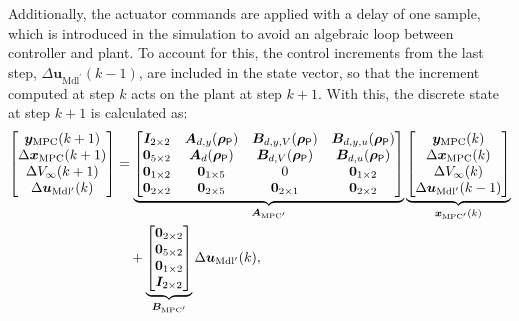 Additionally, the actuator commands are applied with a delay of one sample, which is introduced in the simulation to avoid an algebraic loop between controller and plant. To account for this, the control increments from the last step, $\Delta \bm{u}_{\text{Mdl}^\prime}(k-1)$, are included in the state vector, so that the increment computed at step $k$ acts on the plant at step $k+1$. 
With this, the discrete state at step $k+1$ is calculated as:
\begin{equation} \label{eq:FinalStateSpace}
    \begin{aligned}
        \begin{bmatrix}
            \bm{y}_{\text{MPC}}(k+1) \\
            \Delta \bm{x}_{\text{MPC}}(k+1) \\
            \Delta V_{\infty}(k+1) \\
            \Delta \bm{u}_{\text{Mdl}^\prime}(k)
        \end{bmatrix}
        &=
        \underbrace{\begin{bmatrix}
                \bm{I}_{2\times2} & \bm{A}_{d,y}(\bm{\rho}_{\mathsf{P}}) & \bm{B}_{d,y,V}(\bm{\rho}_{\mathsf{P}}) & \bm{B}_{d,y,u}(\bm{\rho}_{\mathsf{P}}) \\
                \bm{0}_{5\times2} & \bm{A}_{d}(\bm{\rho}_{\mathsf{P}}) & \bm{B}_{d,V}(\bm{\rho}_{\mathsf{P}}) & \bm{B}_{d,u}(\bm{\rho}_{\mathsf{P}}) \\
                \bm{0}_{1\times2} & \bm{0}_{1\times5} & 0 & \bm{0}_{1\times2} \\
                \bm{0}_{2\times2} & \bm{0}_{2\times5} & \bm{0}_{2\times1} & \bm{0}_{2\times2}
        \end{bmatrix}}_{\bm{A}_{\text{MPC}^\prime}}
        \underbrace{\begin{bmatrix}
                \bm{y}_{\text{MPC}}(k) \\
                \Delta \bm{x}_{\text{MPC}}(k) \\
                \Delta V_{\infty}(k) \\
                \Delta \bm{u}_{\text{Mdl}^\prime}(k-1)
        \end{bmatrix}}_{\bm{x}_{\text{MPC}^\prime}(k)} \\
        &\quad +
        \underbrace{\begin{bmatrix}
                \bm{0}_{2\times2} \\
                \bm{0}_{5\times2} \\
                \bm{0}_{1\times2} \\
                \bm{I}_{2\times2}
        \end{bmatrix}}_{\bm{B}_{\text{MPC}^\prime}}
        \Delta \bm{u}_{\text{Mdl}^\prime}(k),
    \end{aligned}
\end{equation}
